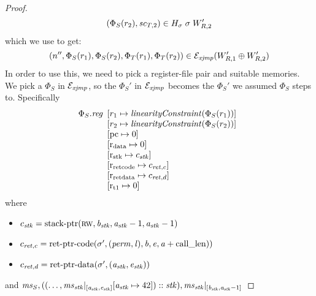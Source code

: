 \documentclass[a4paper]{article}
\begin{document}
\begin{proof}
\[
  (\Phi_S(r_2), \vsc_{T,2}) \in H_\sigma \; \sigma \; W'_{R,2}
\]
which we use to get:
\[
  \npair[n'']{\Phi_S(r_1),\Phi_S(r_2),\Phi_T(r_1),\Phi_T(r_2)} \in \lrexj(W_{R,1}' \oplus W_{R,2}')
\]
In order to use this, we need to pick a register-file pair and suitable memories. We pick a $\Phi_S$ in $\lrexj$, so the $\Phi_S'$ in $\lrexj$ becomes the $\Phi_S'$ we assumed $\Phi_S$ steps to. Specifically
\[
  \Phi_S.\reg
  \begin{array}[t]{l}
    \update{r_1}{\linCons{\Phi_S(r_1)}}\\
    \update{r_2}{\linCons{\Phi_S(r_2)}}\\
    \update{\pcreg}{0} \\
    \update{\rdata}{0} \\
    \update{\rstk}{c_\stk}\\
    \update{\rretc}{c_{\ret,c}}\\
    \update{\rretd}{c_{\ret,d}}\\
    \update{\rtmp{1}}{0}\\
  \end{array}
\]
where
\begin{itemize}
\item $c_\stk = \stkptr{\rw,\baddr_\stk,\aaddr_\stk-1,\aaddr_\stk-1}$
\item $c_{\ret,c} = \retptrc(\sigma',(\perm,\lin),\baddr,\eaddr,\aaddr+\calllen))$
\item $c_{\ret,d} = \retptrd(\sigma',(\aaddr_\stk,\eaddr_\stk))$
\end{itemize}
and
$\ms_S,((\dots,\ms_\stk|_{[\aaddr_\stk,\eaddr_\stk]}\update{\aaddr_\stk}{42}) :: \stk),\ms_\stk|_{[\baddr_\stk,\aaddr_\stk-1]}$


\end{proof}
\end{document}
